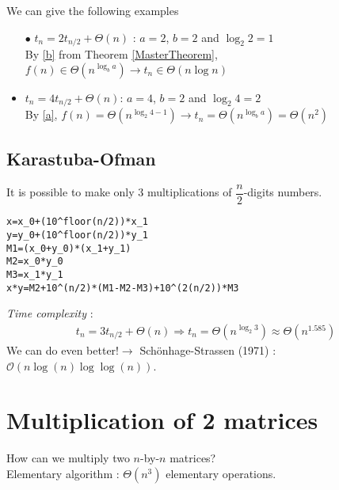 \begin{example}
\begin{leftbar}
We can give the following examples
\begin{itemize}
\item[$\bullet$] $t_n=2t_{n/2}+\Theta(n)$ : $a=2$, $b=2$ and $\log_2 2=1$\\
By \ref{b} from Theorem \ref{MasterTheorem}, $f(n)\in \Theta\left(n^{\log_ba}\right)\rightarrow t_n \in \Theta(n\log n)$
\item $t_n=4t_{n/2}+\Theta(n)$: $a=4$, $b=2$ and $\log_2 4=2$\\
By \ref{a}, $f(n)=\Theta\left(n^{\log_2 4-1}\right)\rightarrow t_n=\Theta\left(n^{\log_ba}\right)=\Theta\left(n^2\right)$
\end{itemize}
\end{leftbar}
\end{example}


\subsection{Karastuba-Ofman}

It is possible to make only 3 multiplications of $\dfrac{n}{2}$-digits numbers.

\begin{lstlisting}[label={list:c3:Multiply(x,y)},caption=\texttt{Multiply(x,y)} \textmd{(Karastuba-Ofman, 1962)}]
x=x_0+(10^floor(n/2))*x_1
y=y_0+(10^floor(n/2))*y_1
M1=(x_0+y_0)*(x_1+y_1)
M2=x_0*y_0
M3=x_1*y_1
x*y=M2+10^(n/2)*(M1-M2-M3)+10^(2(n/2))*M3
\end{lstlisting}


\emph{Time complexity} : 
\begin{align*}
t_n=3t_{n/2}+\Theta (n) \Rightarrow t_n=\Theta\left(n^{\log_2 3}\right)\approx \Theta\left(n^{1.585}\right)
\end{align*}
We can do even better!$\rightarrow$ Schönhage-Strassen (1971) : $\mathcal{O}(n\log(n)\log\log(n))$.

\section{Multiplication of 2 matrices}

How can we multiply two $n$-by-$n$ matrices?\\
Elementary algorithm : $\Theta(n^3)$ elementary operations.

